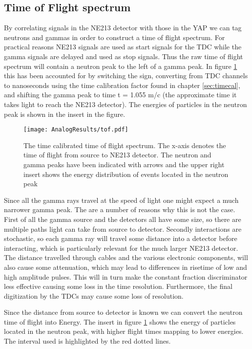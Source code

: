 \documentclass[main.tex]{subfiles}
\begin{document}
\subsection{Time of Flight spectrum}
By correlating signals in the NE213 detector with those in the YAP we can tag neutrons and gammas in order to construct a time of flight spectrum. For practical reasons NE213 signals are used as start signals for the TDC while the gamma signals are delayed and used as stop signals. Thus the raw time of flight spectrum will contain a neutron peak to the left of a gamma peak. In figure \ref{fig:tof_a} this has been accounted for by switching the sign, converting from TDC channels to nanoseconds using the time calibration factor found in chapter \ref{sec:timecal}, and shifting the gamma peak to time t = 1.055 m/c (the approximate time it takes light to reach the NE213 detector). The energies of particles in the neutron peak is shown in the insert in the figure.

\begin{figure}[ht]
    \centering
        \texttt{[image: AnalogResults/tof.pdf]}
        \caption{The time calibrated time of flight spectrum. The x-axis denotes the time of flight from source to NE213 detector. The neutron and gamma peaks have been indicated with arrows and the upper right insert shows the energy distribution of events located in the neutron peak}
    \label{fig:tof_a}
\end{figure}

Since all the gamma rays travel at the speed of light one might expect a much narrower gamma peak. The are a number of reasons why this is not the case. First of all the gamma source and the detectors all have some size, so there are multiple paths light can take from source to detector. Secondly interactions are stochastic, so each gamma ray will travel some distance into a detector before interacting, which is particularly relevant for the much larger NE213 detector. The distance travelled through cables and the various electronic components, will also cause some attenuation, which may lead to differences in risetime of low and high amplitude pulses. This will in turn make the constant fraction discriminator less effective causing some loss in the time resolution. Furthermore, the final  digitization by the TDCs may cause some loss of resolution.

Since the distance from source to detector is known we can convert the neutron time of flight into Energy. The insert in figure \ref{fig:tof_a} shows the energy of particles located in the neutron peak, with higher flight times mapping to lower energies. The interval used is highlighted by the red dotted lines.
\end{document}
